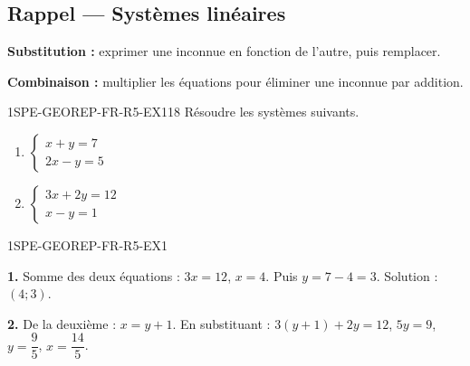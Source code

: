 

\subsection*{Rappel — Systèmes linéaires}

\textbf{Substitution :} exprimer une inconnue en fonction de l'autre, puis remplacer.

\textbf{Combinaison :} multiplier les équations pour éliminer une inconnue par addition.

\begin{exercice}{1SPE-GEOREP-FR-R5-EX1}{1}{8}
Résoudre les systèmes suivants.
\begin{enumerate}
  \item $\begin{cases} x + y = 7 \\ 2x - y = 5 \end{cases}$
  \item $\begin{cases} 3x + 2y = 12 \\ x - y = 1 \end{cases}$
\end{enumerate}
\end{exercice}


\begin{corrige}{1SPE-GEOREP-FR-R5-EX1}

\textbf{1.} Somme des deux équations : $3x = 12$, $x = 4$. Puis $y = 7 - 4 = 3$. Solution : $(4 ; 3)$.

\textbf{2.} De la deuxième : $x = y + 1$. En substituant : $3(y+1) + 2y = 12$, $5y = 9$, $y = \dfrac{9}{5}$, $x = \dfrac{14}{5}$.

\end{corrige}
